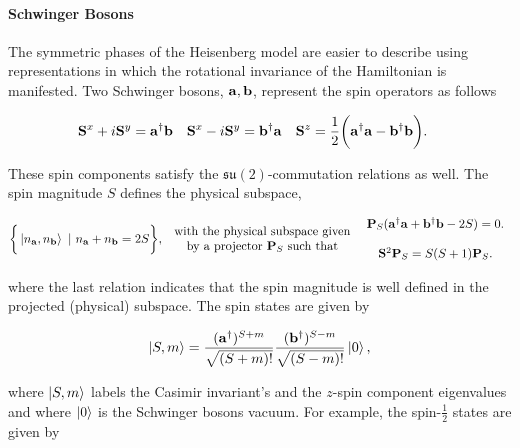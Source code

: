 \documentclass{homework}
\begin{document}
\paragraph{\textbf{Schwinger Bosons}}

The symmetric phases of the Heisenberg model are easier to describe using representations in which the rotational invariance of the Hamiltonian is manifested. Two Schwinger bosons, ${\bf a}, {\bf b}$, represent the spin operators as follows 

\begin{align}
    {\bf S}^x + i {\bf S}^y &= {\bf a}^\dagger {\bf b} & 
    {\bf S}^x - i {\bf S}^y &= {\bf b}^\dagger {\bf a} & {\bf S}^z &= \frac{1}{2} \bigg({\bf a}^\dagger {\bf a} - {\bf b}^\dagger {\bf b}\bigg).
\end{align}

These spin components satisfy the $\mathfrak{s}\mathfrak{u}(2)$-commutation relations as well. The spin magnitude $S$ defines the physical subspace, 

\begin{equation}
    \begin{split}
         \bigg\{\ket{n_{\bf a}, n_{\bf b}} \textnormal{ } | \textnormal{ } n_{\bf a} + n_{\bf b} = 2S\bigg\}, \begin{array}{c}
            \textnormal{ with the physical   subspace given }  \\
            \textnormal{ by a projector ${\bf P}_S$  such that } \\         \end{array} \begin{array}{c}
              {\bf P}_{S}({\bf a}^\dagger {\bf a} + {\bf b}^\dagger {\bf b} - 2S) = 0. \\ 
              \\
              {\bf S}^2 {\bf P}_S = S(S+1) {\bf P}_S.
         \end{array}
     \label{Schwinger_boson_projector}
    \end{split}
\end{equation}

where the last relation indicates that the spin magnitude is well defined in the projected (physical) subspace. The spin states are given by 

\begin{equation}
    \ket{S, m} = \frac{({\bf a}^\dagger)^{S+m}}{\sqrt{(S+m)!}} \frac{({\bf b}^\dagger)^{S-m}}{\sqrt{(S-m)!}} \ket{0}, 
\end{equation}

where $\ket{S,m}$ labels the Casimir invariant's and the $z$-spin component eigenvalues and where $\ket{0}$ is the Schwinger bosons vacuum. For example, the spin-$\frac{1}{2}$ states are given by 
\end{document}
